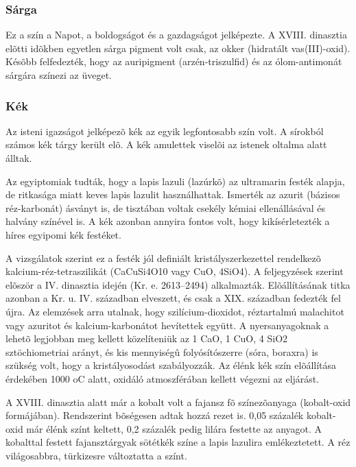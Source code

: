 	\subsubsection{Sárga}
	
	Ez a szín a Napot, a boldogságot és a gazdagságot jelképezte.  A XVIII. dinasztia elõtti idõkben egyetlen sárga pigment volt csak, az okker (hidratált vas(III)-oxid). Késõbb felfedezték, hogy  az auripigment (arzén-triszulfid) és az ólom-antimonát sárgára színezi az üveget.
	
	\subsubsection{Kék}
	
	Az isteni igazságot jelképezõ kék az egyik legfontosabb szín volt. A sírokból számos kék tárgy került elõ. A kék amulettek viselõi az istenek oltalma alatt álltak.
	
	Az egyiptomiak tudták, hogy a lapis lazuli (lazúrkõ) az ultramarin festék alapja, de ritkasága miatt keves lapis lazulit használhattak. Ismerték az azurit (bázisos réz-karbonát) ásványt is, de tisztában voltak csekély kémiai ellenállásával és halvány színével is. A kék azonban annyira fontos volt, hogy kikísérletezték a híres egyipomi kék festéket.
	
	A vizsgálatok szerint ez a festék jól definiált kristályszerkezettel rendelkezõ kalcium-réz-tetraszilikát (CaCuSi4O10 vagy CuO, 4SiO4). A feljegyzések szerint elõször a IV. dinasztia idején (Kr. e. 2613–2494) alkalmazták.  Elõállításának titka azonban a Kr. u. IV. században elveszett, és csak a XIX. században fedezték fel újra. Az elemzések arra utalnak, hogy szilícium-dioxidot, réztartalmú malachitot vagy azuritot és kalcium-karbonátot hevítettek együtt. A nyersanyagoknak a lehetõ legjobban meg kellett közelíteniük az 1 CaO, 1 CuO, 4 SiO2  sztöchiometriai arányt, és kis mennyiségû folyósítószerre (sóra, boraxra) is szükség volt, hogy a kristályosodást szabályozzák. Az élénk kék szín elõállítása érdekében 1000 oC alatt, oxidáló atmoszférában kellett végezni az eljárást.
	
	A XVIII. dinasztia alatt már a kobalt volt a fajansz fõ színezõanyaga (kobalt-oxid formájában). Rendszerint bõségesen adtak hozzá rezet is. 0,05 százalék kobalt-oxid már élénk színt keltett, 0,2 százalék pedig lilára festette az anyagot. A kobalttal festett fajansztárgyak sötétkék színe a lapis lazulira emlékeztetett. A réz világosabbra, türkizesre változtatta a színt.
	
